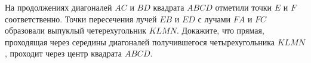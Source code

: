 
На продолжениях диагоналей $AC$ и $BD$ квадрата $ABCD$ отметили точки $E$ и $F$ соответственно. Точки пересечения лучей 
$EB$ и $ED$ с лучами $FA$ и $FC$ образовали выпуклый четерехугольник $KLMN$. Докажите, что прямая, проходящая через 
середины диагоналей получившегося четырехугольника $KLMN$, проходит через центр квадрата $ABCD$.